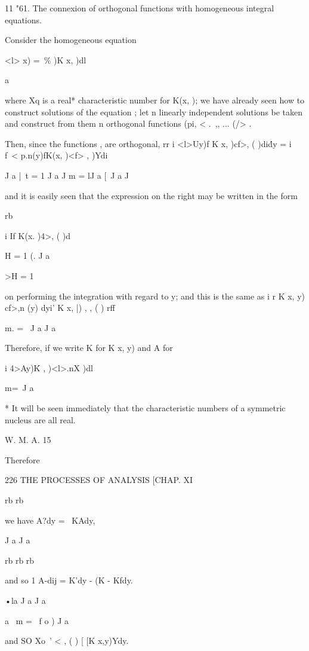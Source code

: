 {11 "61. The connexion of orthogonal functions with homogeneous integral 
equations. 

Consider the homogeneous equation 

<l> x) = \,\%  )K x, )dl 

  a 

where Xq is a real* characteristic number for K(x,  ); we have already seen 
how to construct solutions of the equation ; let n linearly independent solutions 
be taken and construct from them n orthogonal functions (pi, < .\ ,, ... (/> . 

Then, since the functions  ,  are orthogonal, 
rr i <l>Uy)f K x, )cf>, ( )di\'dy = i f\ < p.n(y)fK(x, )<f> ,  )Ydi  

J a |\  t = 1 J a J m = lJ a [\  J a J 

and it is easily seen that the expression on the right may be written in the 
form 

rb 



i If K(x. )4>, ( )d  

H = 1 (. J a 



>H = 1 

on performing the integration with regard to y; and this is the same as 
i r K  x, y) cf>,n (y) dyi' K  x, |) , ,  ( ) rff 

m. = \ J a J a 

Therefore, if we write K for K  x, y) and A for 

i 4>Ay)\' K  , )<l>.nX )dl 

m=\ J a 



* It will be seen immediately that the characteristic numbers of a symmetric nucleus are all 
real. 

W. M. A. 15 



Therefore 



226 THE PROCESSES OF ANALYSIS [CHAP. XI 

rb rb 

we have A?dy = \ KAdy, 

J a J a 

rb rb rb 

and so 1 A-dij = K'dy - (K - Kfdy. 

•la J a J a 

a \ m = \ f o ) J a 

and SO Xo~'    < , ( )  [ [K x,y)Ydy. 

}
